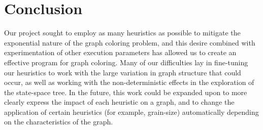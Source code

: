 \documentclass[10pt,oneside]{article}
\begin{document}
\section{Conclusion}
Our project sought to employ as many heuristics as possible to mitigate the
  exponential nature of the graph coloring problem, and this desire combined
  with experimentation of other execution parameters has allowed us to create
  an effective program for graph coloring. Many of our difficulties lay in
  fine-tuning our heuristics to work with the large variation in graph
  structure that could occur, as well as working with the non-deterministic
  effects in the exploration of the state-space tree. In the future, this work
  could be expanded upon to more clearly express the impact of each heuristic
  on a graph, and to change the application of certain heuristics (for example, grain-size)
  automatically depending on the characteristics of the graph.

\nocite{*}

\end{document}
